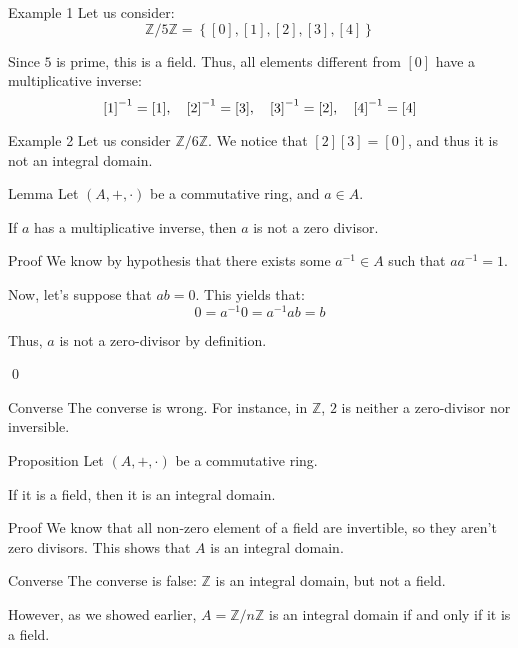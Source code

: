 \documentclass[a4paper]{article}
\begin{document}
\begin{parag}{Example 1}
    Let us consider: 
    \[\mathbb{Z}/5\mathbb{Z} = \left\{\left[0\right], \left[1\right], \left[2\right], \left[3\right], \left[4\right]\right\}\]
    
    Since $5$ is prime, this is a field. Thus, all elements different from $\left[0\right]$ have a multiplicative inverse: 
    \[\left[1\right]^{-1} = \left[1\right], \mathspace \left[2\right]^{-1} = \left[3\right], \mathspace \left[3\right]^{-1} = \left[2\right], \mathspace \left[4\right]^{-1} = \left[4\right]\]
\end{parag}

\begin{parag}{Example 2}
    Let us consider $\mathbb{Z}/6\mathbb{Z}$. We notice that $\left[2\right]\left[3\right] = \left[0\right]$, and thus it is not an integral domain.
\end{parag}

\begin{parag}{Lemma}
    Let $\left(A, +, \cdot \right)$ be a commutative ring, and $a \in A$.

    If $a$ has a multiplicative inverse, then $a$ is not a zero divisor.

    \begin{subparag}{Proof}
        We know by hypothesis that there exists some $a^{-1} \in A$ such that $aa^{-1} = 1$.

        Now, let's suppose that $ab = 0$. This yields that: 
        \[0 = a^{-1} 0 = a^{-1} ab = b\]
        
        Thus, $a$ is not a zero-divisor by definition.

        \qed
    \end{subparag}

    \begin{subparag}{Converse}
        The converse is wrong. For instance, in $\mathbb{Z}$, $2$ is neither a zero-divisor nor inversible.
    \end{subparag}
\end{parag}


\begin{parag}{Proposition}
    Let $\left(A, +, \cdot \right)$ be a commutative ring.

    If it is a field, then it is an integral domain.

    \begin{subparag}{Proof}
        We know that all non-zero element of a field are invertible, so they aren't zero divisors. This shows that $A$ is an integral domain.
    \end{subparag}

    \begin{subparag}{Converse}
        The converse is false: $\mathbb{Z}$ is an integral domain, but not a field.

        However, as we showed earlier, $A = \mathbb{Z}/n\mathbb{Z}$ is an integral domain if and only if it is a field.
    \end{subparag}
\end{parag}
\end{document}
